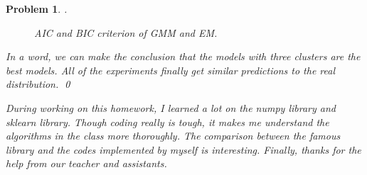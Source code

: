 \documentclass[12pt]{article}
\newtheorem{hw}{Problem}
\newenvironment{sol}
  {\par\vspace{3mm}\noindent{\it Solution}.}
  {\qed}
\begin{document}
\begin{hw}
\begin{sol}
	\begin{figure}[ht]
		\centering
		\caption{AIC and BIC criterion of GMM and EM.}
		\label{fig_criterion}
	\end{figure}


	In a word, we can make the conclusion that the models with three clusters are the best models. All of the experiments finally get similar predictions to the real distribution.
\end{sol}

During working on this homework, I learned a lot on the numpy library and sklearn library. Though coding really is tough, it makes me understand the algorithms in the class more thoroughly. The comparison between the famous library and the codes implemented by myself is interesting. Finally, thanks for the help from our teacher and assistants.
\end{hw}
\end{document}
